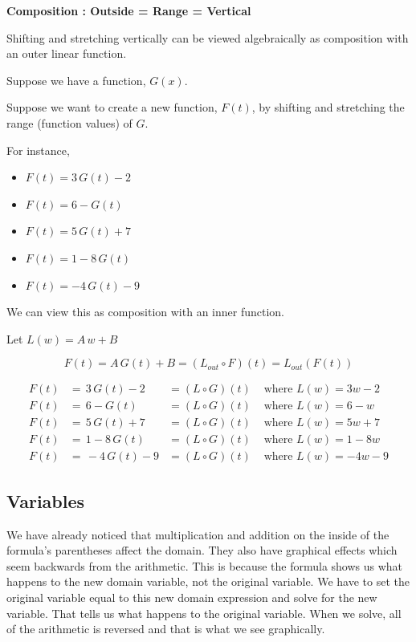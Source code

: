 \documentclass{ximera}
\begin{document}
\textbf{\textcolor{red!70!black}{Composition : Outside = Range = Vertical}}


Shifting and stretching vertically can be viewed algebraically as composition with an outer linear function.



Suppose we have a function, $G(x)$. 

Suppose we want to create a new function, $F(t)$, by shifting and stretching the range (function values) of $G$.


For instance, 
\begin{itemize}
\item $F(t) = 3 \, G(t)-2$
\item $F(t) = 6-G(t)$
\item $F(t) = 5 \, G(t)+7$
\item $F(t) = 1 - 8 \, G(t)$
\item $F(t) = -4 \, G(t)-9$
\end{itemize}


We can view this as composition with an inner function.

Let $L(w) = A \, w + B$


\[ F(t) = A \, G(t) + B = (L_{out} \circ F)(t) = L_{out}(F(t)) \]




\begin{align*}
F(t) & = \, 3 \, G(t)-2 & = (L \circ G)(t)  & \text{ where } L(w) = 3w-2 \\
F(t) & = \, 6-G(t) & = (L \circ G)(t)   & \text{ where } L(w) = 6-w    \\
F(t) & = \, 5 \, G(t)+7 & = (L \circ G)(t)  & \text{ where } L(w) = 5w+7   \\
F(t) & = \, 1 - 8 \, G(t) & = (L \circ G)(t)  & \text{ where } L(w) = 1-8w    \\
F(t) & = \, -4 \, G(t)-9 & = (L \circ G)(t) & \text{ where } L(w) = -4w-9   
\end{align*}






\subsection*{Variables}












We have already noticed that multiplication and addition on the inside of the formula's parentheses affect the domain.  They also have graphical effects which seem backwards from the arithmetic.  This is because the formula shows us what happens to the new domain variable, not the original variable.  We have to set the original variable equal to this new domain expression and solve for the new variable.  That tells us what happens to the original variable.  When we solve, all of the arithmetic is reversed and that is what we see graphically.
\end{document}
